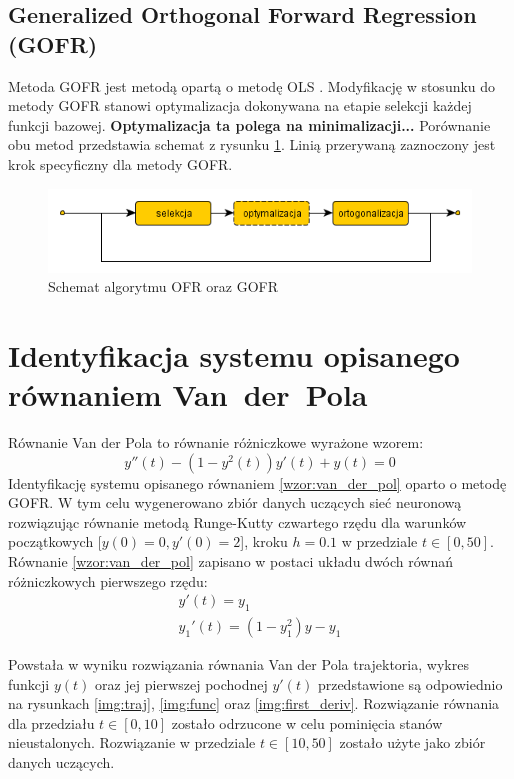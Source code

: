 \subsection{Generalized Orthogonal Forward Regression (GOFR)}
Metoda GOFR jest metodą opartą o metodę OLS \cite{Duboisa}. Modyfikację w stosunku do metody GOFR stanowi optymalizacja dokonywana na etapie selekcji każdej funkcji bazowej. \textbf{Optymalizacja ta polega na minimalizacji...} Porównanie obu metod przedstawia schemat z rysunku \ref{ofr_and_gofr}. Linią przerywaną zaznoczony jest krok specyficzny dla metody GOFR.

\begin{figure}[ht!]
	\centering
	
	\includegraphics[scale=0.7]{images/ofr_and_gofr.png}
	\caption{Schemat algorytmu OFR oraz GOFR}
	\label{ofr_and_gofr}	

\end{figure}

\clearpage
\section{Identyfikacja systemu opisanego równaniem \mbox{Van der Pola}}

Równanie Van der Pola to równanie różniczkowe wyrażone wzorem:
\begin{equation}
	\label{wzor:van_der_pol}
	y''(t) - (1 - y^2(t))y'(t) + y(t) = 0
\end{equation}
Identyfikację systemu opisanego równaniem \ref{wzor:van_der_pol} oparto o metodę GOFR. W tym celu wygenerowano zbiór danych uczących sieć neuronową rozwiązując równanie metodą Runge-Kutty czwartego rzędu dla warunków początkowych [$y(0)=0,y'(0)=2$], kroku $h=0.1$ w przedziale $t \in [0,50]$. Równanie \ref{wzor:van_der_pol} zapisano w postaci układu dwóch równań różniczkowych pierwszego rzędu:
\begin{equation}
	\begin{array}{l}
    y'(t)  = y_1 \\
    y_1'(t) = (1-y_1^2)y-y_1
    \end{array}
\end{equation}

Powstała w wyniku rozwiązania równania Van der Pola trajektoria, wykres funkcji $y(t)$ oraz jej pierwszej pochodnej $y'(t)$ przedstawione są odpowiednio na rysunkach \ref{img:traj}, \ref{img:func} oraz \ref{img:first_deriv}. Rozwiązanie równania dla przedziału $t \in [0,10]$ zostało odrzucone w celu pominięcia stanów nieustalonych. Rozwiązanie w przedziale $t \in [10,50]$ zostało użyte jako zbiór danych uczących.

